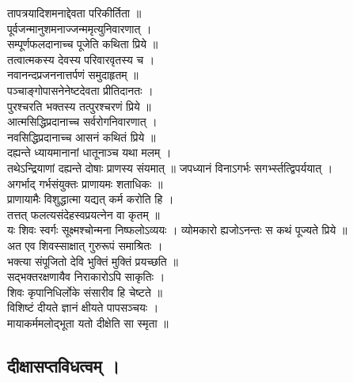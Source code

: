 तापत्रयादिशमनाद्देवता परिकीर्तिता ॥\\
पूर्वजन्मानुशमनाज्जन्ममृत्युनिवारणात् ।\\[-2mm]
सम्पूर्णफलदानाच्च पूजेति कथिता प्रिये ॥\\
तत्वात्मकस्य देवस्य परिवारवृतस्य च ।\\[-2mm]
नवानन्दप्रजननात्तर्पणं समुदाहृतम् ॥\\
पञ्चाङ्गोपासनेनेष्टदेवता प्रीतिदानतः ।\\[-2mm]
पुरश्चरति भक्तस्य तत्पुरश्चरणं प्रिये ॥\\
आत्मसिद्धिप्रदानाच्च सर्वरोगनिवारणात् ।\\[-2mm]
नवसिद्धिप्रदानाच्च आसनं कथितं प्रिये ॥\\
दह्यन्ते ध्यायमानानां धातूनाञ्च यथा मलम् ।\\[-2mm]
तथेऽन्द्रियाणां दह्यन्ते दोषाः प्राणस्य संयमात् ॥  
जपध्यानं विनाऽगर्भः सगर्भ्स्तत्द्विपर्ययात् ।\\[-2mm]
अगर्भाद् गर्भसंयुक्तः प्राणायमः शताधिकः ॥\\
प्राणायामैः विशुद्धात्मा यद्यत् कर्म करोति हि ।\\[-2mm]
तत्तत् फलत्यसंदेहस्वप्रयत्नेन वा कृतम् ॥\\
यः शिवः स्वर्गः सूक्ष्मश्चोन्मना निष्फलोऽव्ययः । 
व्योमकारो ह्यजोऽनन्तः स कथं पूज्यते प्रिये ॥\\
अत एव शिवस्साक्षात् गुरुरूपं समाश्रितः ।\\[-2mm]
भक्त्या संपूजितो देवि भुक्तिं मुक्तिं प्रयच्छति ॥\\
सद्भक्तरक्षणायैव निराकारोऽपि साकृतिः ।\\[-2mm]
शिवः कृपानिधिर्लोके संसारीव हि चेष्टते ॥\\
विशिष्टं दीयते ज्ञानं क्षीयते पापसञ्चयः ।\\[-2mm]
मायाकर्ममलोद्भूता यतो दीक्षेति सा स्मृता ॥\\
	
\subsection{दीक्षासप्तविधत्वम् ।}

